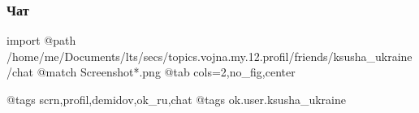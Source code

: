  
 
 
 
 

\subsubsection{Чат}

\ifcmt
  import
  @path /home/me/Documents/lts/secs/topics.vojna.my.12.profil/friends/ksusha_ukraine/chat
  @match Screenshot*.png
  @tab cols=2,no_fig,center

  @tags scrn,profil,demidov,ok_ru,chat
  @tags ok.user.ksusha_ukraine

\fi
